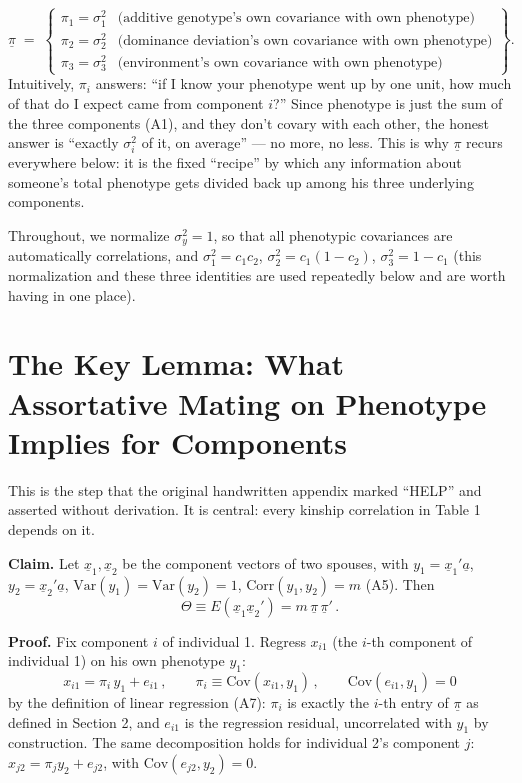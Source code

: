 \documentclass[12pt]{article}
\begin{document}
\begin{description}
\begin{equation*}
\underline\pi \;=\;
\left\{\begin{array}{ll}
\pi_1 = \sigma_1^2 & \text{(additive genotype's own covariance with own phenotype)} \\
\pi_2 = \sigma_2^2 & \text{(dominance deviation's own covariance with own phenotype)} \\
\pi_3 = \sigma_3^2 & \text{(environment's own covariance with own phenotype)}
\end{array}\right\} .
\end{equation*}
Intuitively, $\pi_i$ answers: ``if I know your phenotype went up by one unit, how much of that do I expect came from component $i$?'' Since phenotype is just the sum of the three components (A1), and they don't covary with each other, the honest answer is ``exactly $\sigma_i^2$ of it, on average'' — no more, no less. This is why $\underline\pi$ recurs everywhere below: it is the fixed ``recipe'' by which any information about someone's total phenotype gets divided back up among his three underlying components.
\item[Normalization.] Throughout, we normalize $\sigma_y^2=1$, so that all phenotypic covariances are automatically correlations, and $\sigma_1^2=c_1c_2$, $\sigma_2^2=c_1(1-c_2)$, $\sigma_3^2=1-c_1$ (this normalization and these three identities are used repeatedly below and are worth having in one place).
\end{description}

\section{The Key Lemma: What Assortative Mating on Phenotype Implies for Components}

This is the step that the original handwritten appendix marked ``HELP'' and asserted without derivation. It is central: every kinship correlation in Table 1 depends on it.

\textbf{Claim.} Let $\underline x_1,\underline x_2$ be the component vectors of two spouses, with $y_1=\underline x_1'\underline a$, $y_2=\underline x_2'\underline a$, $\mathrm{Var}(y_1)=\mathrm{Var}(y_2)=1$, $\mathrm{Corr}(y_1,y_2)=m$ (A5). Then
\begin{equation}
\Theta \equiv E(\underline x_1\underline x_2') = m\,\underline\pi\,\underline\pi' \, .
\end{equation}

\textbf{Proof.} Fix component $i$ of individual 1. Regress $x_{i1}$ (the $i$-th component of individual 1) on his own phenotype $y_1$:
\begin{equation}
x_{i1} = \pi_i\,y_1 + e_{i1} \, , \qquad \pi_i \equiv \mathrm{Cov}(x_{i1},y_1) \, , \qquad \mathrm{Cov}(e_{i1},y_1)=0
\end{equation}
by the definition of linear regression (A7): $\pi_i$ is exactly the $i$-th entry of $\underline\pi$ as defined in Section 2, and $e_{i1}$ is the regression residual, uncorrelated with $y_1$ by construction. The same decomposition holds for individual 2's component $j$: $x_{j2}=\pi_j y_2 + e_{j2}$, with $\mathrm{Cov}(e_{j2},y_2)=0$.
\end{document}

